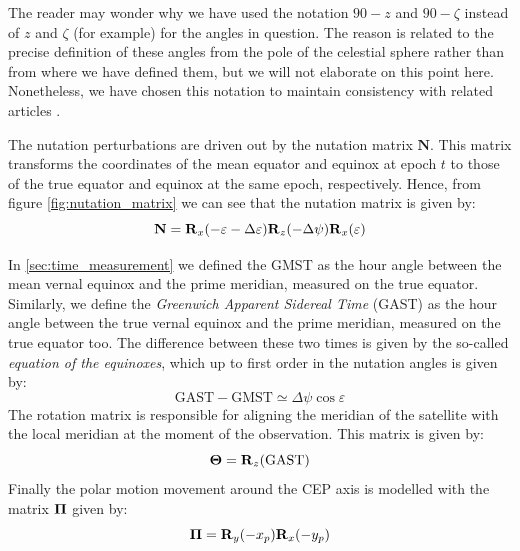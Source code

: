 \documentclass[../main.tex]{subfiles}
\begin{document}
The reader may wonder why we have used the notation $90-z$ and $90-\zeta$ instead of $z$ and $\zeta$ (for example) for the angles in question. The reason is related to the precise definition of these angles from the pole of the celestial sphere rather than from where we have defined them, but we will not elaborate on this point here. Nonetheless, we have chosen this notation to maintain consistency with related articles \cite{lieske}.

The nutation perturbations are driven out by the nutation matrix $\mathbf{N}$. This matrix transforms the coordinates of the mean equator and equinox at epoch $t$ to those of the true equator and equinox at the same epoch, respectively. Hence, from figure \cref{fig:nutation_matrix} we can see that the nutation matrix is given by:
\begin{equation}
  \mathbf{N}=\boldsymbol{\mathrm{R}}_x(-\varepsilon-\Delta \varepsilon)\boldsymbol{\mathrm{R}}_z(-\Delta \psi)\boldsymbol{\mathrm{R}}_x(\varepsilon)
\end{equation}

In \cref{sec:time_measurement} we defined the GMST as the hour angle between the mean vernal equinox and the prime meridian, measured on the true equator. Similarly, we define the \emph{Greenwich Apparent Sidereal Time} (GAST) as the hour angle between the true vernal equinox and the prime meridian, measured on the true equator too. The difference between these two times is given by the so-called \emph{equation of the equinoxes}, which up to first order in the nutation angles is given by:
\begin{equation}
  \text{GAST}- \text{GMST}\simeq\Delta \psi\cos\varepsilon
\end{equation}
The rotation matrix is responsible for aligning the meridian of the satellite with the local meridian at the moment of the observation. This matrix is given by:
\begin{equation}
  \boldsymbol{\mathrm{\Theta}}=\boldsymbol{\mathrm{R}}_z(\text{GAST})
\end{equation}
Finally the polar motion movement around the CEP axis is modelled with the matrix $\boldsymbol{\mathrm{\Pi}}$ given by:
\begin{equation}
  \boldsymbol{\mathrm{\Pi}}=\boldsymbol{\mathrm{R}}_y(- x_p)\boldsymbol{\mathrm{R}}_x(- y_p)
\end{equation}
\end{document}
